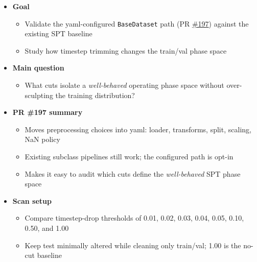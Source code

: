 \begin{frame}[plain]
  \vspace{13mm}
  {\fontsize{8.3}{9.7}\selectfont
  \begin{minipage}{0.88\textwidth}
  {
  \begin{itemize}
    \item \textbf{Goal}
    \begin{itemize}
      \item Validate the yaml-configured \texttt{BaseDataset} path (PR \href{https://github.com/anl-hep-ai-ml/CrossExperimentalAIDQM/pull/197}{\#197}) against the existing SPT baseline
      \item Study how timestep trimming changes the train/val phase space
    \end{itemize}
    \vspace{1mm}
    \item \textbf{Main question}
    \begin{itemize}
      \item What cuts isolate a \emph{well-behaved} operating phase space without over-sculpting the training distribution?
    \end{itemize}
    \vspace{1mm}
    \item \textbf{PR \#197 summary}
    \begin{itemize}
      \item Moves preprocessing choices into yaml: loader, transforms, split, scaling, NaN policy
      \item Existing subclass pipelines still work; the configured path is opt-in
      \item Makes it easy to audit which cuts define the \emph{well-behaved} SPT phase space
    \end{itemize}
    \vspace{1mm}
    \item \textbf{Scan setup}
    \begin{itemize}
      \item Compare timestep-drop thresholds of 0.01, 0.02, 0.03, 0.04, 0.05, 0.10, 0.50, and 1.00
      \item Keep test minimally altered while cleaning only train/val; 1.00 is the no-cut baseline
    \end{itemize}
  \end{itemize}}
  \end{minipage}}

  \slideheaderfooter
\end{frame}
